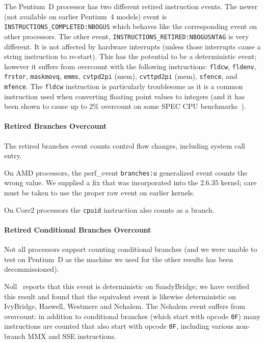 The Pentium~D processor has two different 
retired instruction events.  
The newer (not available on earlier Pentium~4 models)
event is {\tt INSTRUCTIONS\_COMPLETED:NBOGUS} which behaves like the 
corresponding event on other processors.
The other event, {\tt INSTRUCTIONS\-\_RETIRED\-:NBOGUSNTAG} is very different.
It is not affected by hardware interrupts (unless those interrupts cause a 
string instruction to re-start).  
This has the potential to be a deterministic event; however 
it suffers from overcount with the following instructions:
{\tt fldcw}, 
{\tt fldenv}, {\tt frstor}, {\tt maskmovq}, {\tt emms}, {\tt cvtpd2pi} (mem),
{\tt cvttpd2pi} (mem), {\tt sfence}, and {\tt mfence}.  
The {\tt fldcw}
instruction is particularly troublesome as it is a common instruction
used when converting floating point values to integers (and it has
been shown to cause up to 2\%
overcount on some SPEC CPU benchmarks~\cite{weaver+:iiswc08}).

\paragraph{Retired Branches Overcount}
The retired branches event counts control flow changes, 
including system call entry.

On AMD processors, the perf\_event {\tt branches:u} generalized event counts 
the wrong value.  We supplied a fix that was incorporated into the 2.6.35
kernel; care must be taken to use the proper 
raw event on earlier kernels.

On Core2 processors the {\tt cpuid} instruction also counts as a branch.

\paragraph{Retired Conditional Branches Overcount}
Not all processors support counting 
conditional branches (and we were unable
to test on Pentium~D as the machine we used 
for the other results has been decommissioned).

Noll~\cite{noll:pc2011} reports that this event
is deterministic on SandyBridge; we have verified
this result and found that the equivalent event
is likewise deterministic on IvyBridge, Haswell, Westmere and Nehalem.
The Nehalem event suffers from overcount:
in addition to conditional branches (which start with opcode {\tt 0F})
many instructions are counted that also start with opcode {\tt 0F},
including various non-branch MMX and SSE instructions.

